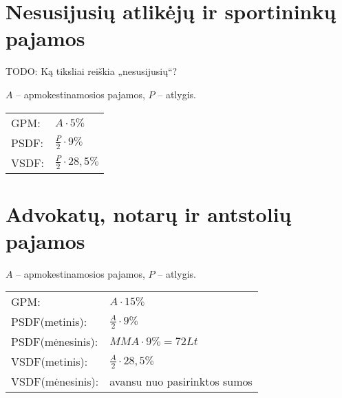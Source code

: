 \section{Nesusijusių atlikėjų ir sportininkų pajamos}

TODO: Ką tiksliai reiškia „nesusijusių“?

$A$ – apmokestinamosios pajamos, $P$ – atlygis.

\begin{tabularx}{15cm}{p{7.5cm}|p{7.5cm}}
  GPM: & $A \cdot 5\%$ \\
  PSDF: & $\frac{P}{2} \cdot 9\%$ \\
  VSDF: & $\frac{P}{2} \cdot 28,5\%$ \\
\end{tabularx}

\section{Advokatų, notarų ir antstolių pajamos}

$A$ – apmokestinamosios pajamos, $P$ – atlygis.

\begin{tabularx}{15cm}{p{7.5cm}|p{7.5cm}}
  GPM: & $A \cdot 15\%$ \\
  PSDF(metinis): & $\frac{A}{2} \cdot 9\%$ \\
  PSDF(mėnesinis): & $MMA \cdot 9\% = 72 Lt$ \\
  VSDF(metinis): & $\frac{A}{2} \cdot 28,5\%$ \\
  VSDF(mėnesinis): & avansu nuo pasirinktos sumos \\
\end{tabularx}
